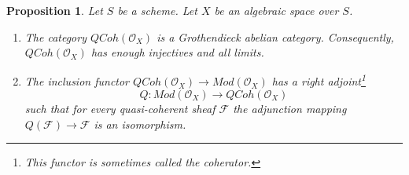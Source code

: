 \documentclass{stacks-project}
\theoremstyle{plain}
\newtheorem{proposition}[subsection]{Proposition}
\theoremstyle{definition}
\theoremstyle{remark}
\numberwithin{equation}{subsection}
\def\QCoh{\mathit{QCoh}}
\begin{document}
\begin{proposition}
\label{proposition-coherator}
Let $S$ be a scheme. Let $X$ be an algebraic space over $S$.
\begin{enumerate}
\item The category $\QCoh(\mathcal{O}_X)$ is a Grothendieck
abelian category. Consequently, $\QCoh(\mathcal{O}_X)$
has enough injectives and all limits.
\item The inclusion functor
$\QCoh(\mathcal{O}_X) \to \textit{Mod}(\mathcal{O}_X)$
has a right adjoint\footnote{This functor is sometimes called
the {\it coherator}.}
$$
Q : \textit{Mod}(\mathcal{O}_X) \longrightarrow \QCoh(\mathcal{O}_X)
$$
such that for every quasi-coherent sheaf $\mathcal{F}$ the adjunction mapping
$Q(\mathcal{F}) \to \mathcal{F}$ is an isomorphism.
\end{enumerate}
\end{proposition}
\end{document}
